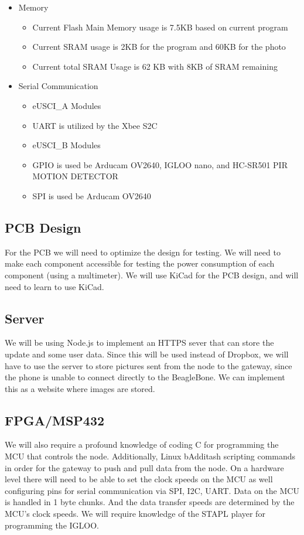 \documentclass[11pt]{article}
\begin{document}
\begin{itemize}

\item Memory 
\begin{itemize}
\item Current Flash Main Memory usage is 7.5KB based on current program 
\item Current SRAM usage is 2KB for the program and 60KB for the photo 
\item Current total SRAM Usage is 62 KB with 8KB of SRAM remaining 
\end{itemize}
\item Serial Communication 
\begin{itemize}
\item eUSCI\_A Modules 
\item UART is utilized by the Xbee S2C 
\item eUSCI\_B Modules 
\item GPIO is used be Arducam OV2640, IGLOO nano, and HC-SR501 PIR MOTION DETECTOR 
\item SPI is used be Arducam OV2640 
\end{itemize}
\end{itemize}
 
\subsection{PCB Design}
For the PCB we will need to optimize the design for testing. We will need to make each component accessible for testing the power consumption of each component (using a multimeter). We will use KiCad for the PCB design, and will need to learn to use KiCad. 

\subsection{Server}

We will be using Node.js to implement an HTTPS sever that can store the update and some user data. Since this will be used instead of Dropbox, we will have to use the server to store pictures sent from the node to the gateway, since the phone is unable to connect directly to the BeagleBone. We can implement this as a website where images are stored. 


\subsection{FPGA/MSP432}
We will also require a profound knowledge of coding C for programming the MCU that controls the node. Additionally, Linux bAdditash scripting commands in order for the gateway to push and pull data from the node. On a hardware level there will need to be able to set the clock speeds on the MCU as well configuring pins for serial communication via SPI, I2C, UART. Data on the MCU is handled in 1 byte chunks. And the data transfer speeds are determined by the MCU’s clock speeds. We will require knowledge of the STAPL player for programming the IGLOO. 
\end{document}
